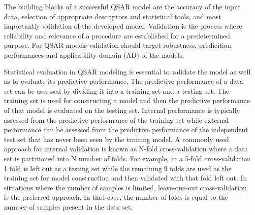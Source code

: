 The building blocks of a successful QSAR model are the accuracy of the input data, selection of appropriate descriptors and statistical tools, and most importantly validation of the developed model. Validation is the process where reliability and relevance of a procedure are established for a predetermined purpose. For QSAR models validation should target robustness, predicition performances and applicability domain (AD) of the models. \cite{Lapins2013}

Statistical evaluation in QSAR modeling is essential to validate the model as well as to evaluate its predictive performance. The predictive performance of a data set can be assessed by dividing it into a training set and a testing set. The training set is used for constructing a model and then the predictive performance of that model is evaluated on the testing set. Internal performance is typically assessed from the predictive performance of the training set while external performance can be assessed from the predictive performance of the independent test set that has never been seen by the training model. A commonly used approach for internal validation is known as N-fold cross-validation where a data set is partitioned into N number of folds. For example, in a 5-fold cross-validation 1 fold is left out as a testing set while the remaining 9 folds are used as the training set for model construction and then validated with that fold left out. In situations where the number of samples is limited, leave-one-out cross-validation is the preferred approach. In that case, the number of folds is equal to the number of samples present in the data set. \cite{Nantasenamat2009}



